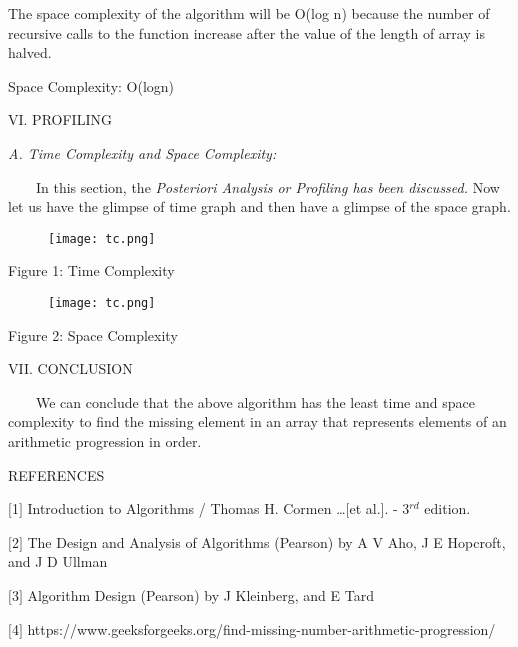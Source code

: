 \documentclass[12pt,a4paper]{article}
\begin{document}
\begin{multicols}{2}
The space complexity of the algorithm will be O(log n) because the number of recursive calls to the function increase after the value of the length of array is halved.

Space Complexity: O(logn)



\begin{center}VI. PROFILING\end{center}



\textit{A. Time Complexity and Space Complexity:}

\ \ \ \ In this section, the  \textit{Posteriori Analysis or Profiling has been discussed. }
Now let us have the glimpse of time graph and then have a glimpse of the space graph.
\end{multicols}
\begin{figure}[h]
\centering
\texttt{[image: tc.png]}
\end{figure}

\begin{multicols}{2}
\begin{center}Figure 1: Time Complexity\end{center}


\end{multicols}
\begin{figure}[h]
\centering
\texttt{[image: tc.png]}
\end{figure}

\begin{multicols}{2}
\begin{center}Figure 2: Space Complexity\end{center}





\begin{center}VII. CONCLUSION\end{center}

\ \ \ \ We can conclude that the above algorithm has the least time and space 
complexity to find the missing element in an array that represents elements of an arithmetic progression in order.


\begin{center}REFERENCES\end{center}

$[$1$]$ Introduction to Algorithms / Thomas H. Cormen \ldots $[$et 
al.$]$. - 3$^{rd}$ edition.

$[$2$]$ The Design and Analysis of Algorithms (Pearson) by A V Aho, J E 
Hopcroft, and J D Ullman 

$[$3$]$ Algorithm Design (Pearson) by J Kleinberg, and E Tard

$[$4$]$ https://www.geeksforgeeks.org/find-missing-number-arithmetic-progression/

\end{multicols}
\end{document}
